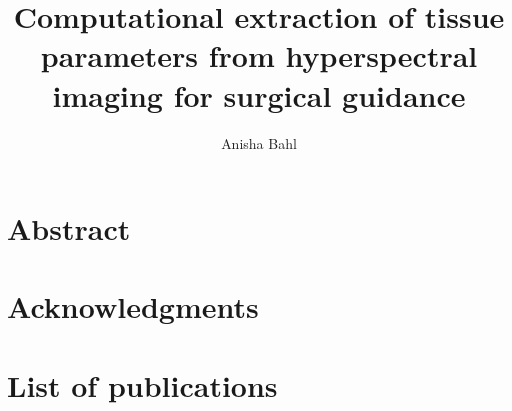 \documentclass[british,a4paper,11pt,twoside]{StyleThese}
\title{Computational extraction of tissue parameters from hyperspectral imaging for surgical guidance}\let\thetitle\@title
\author{Anisha Bahl}\let\theauthor\@author
\begin{document}
\frontmatter


%

\dominitoc

\copyrightpage{\the\year}{\theauthor}
\declarationpage{\theauthor}

\cleardoublepage
\chapter{Abstract}



\cleardoublepage
\chapter{Acknowledgments}


\cleardoublepage
\chapter*{List of publications}


\cleardoublepage
\tableofcontents

\clearpage
\listoftables
\clearpage
\listoffigures

\mainmatter













\backmatter



 
\end{document}
